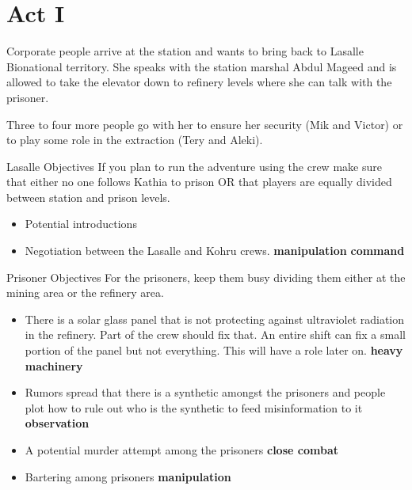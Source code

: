 \chapter{Act I}



\begin{rpg-commentbox}{}

    Corporate people arrive at the station and  wants to bring  back to Lasalle Bionational territory. She speaks with the station marshal Abdul Mageed and is allowed to take the elevator down to refinery levels where she can talk with the prisoner.

    Three to four more people go with her to ensure her security (Mik and Victor) or to play some role in the extraction (Tery and Aleki). 
    
\end{rpg-commentbox}


\medskip
\begin{rpg-commentbox}{Lasalle Objectives}
If you plan to run the adventure using the crew make sure that either no one follows Kathia to prison OR that players are equally divided between station and prison levels.

\begin{itemize}
    \item Potential introductions

    \item Negotiation between the Lasalle and Kohru crews. \textbf{manipulation} \textbf{command}
\end{itemize}
\end{rpg-commentbox}



\medskip
\begin{rpg-commentbox}{Prisoner Objectives}
For the prisoners, keep them busy dividing them either at the mining area or the refinery area.

\begin{itemize}
    \item There is a solar glass panel that is not protecting against ultraviolet radiation in the refinery. Part of the crew should fix that. An entire shift can fix a small portion of the panel but not everything. This will have a role later on. \textbf{heavy machinery}

    \item Rumors spread that there is a synthetic amongst the prisoners and people plot how to rule out who is the synthetic to feed misinformation to it \textbf{observation}

    \item A potential murder attempt among the prisoners \textbf{close combat}

    \item Bartering among prisoners \textbf{manipulation}
\end{itemize}
\end{rpg-commentbox}


